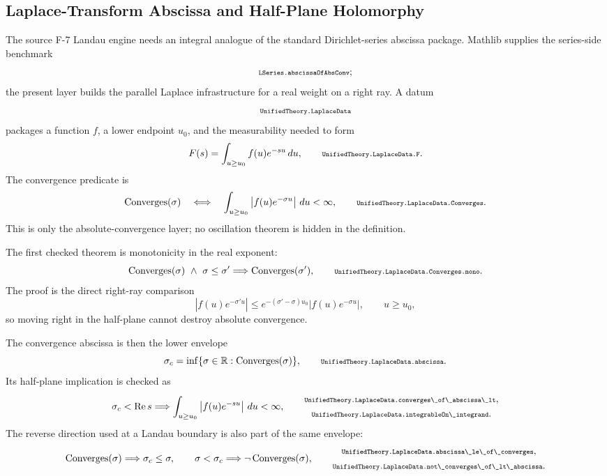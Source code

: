\documentclass[11pt]{article}
\newcommand{\lean}[1]{\relax\ifmmode\hbox{\scriptsize\ttfamily\detokenize{#1}}\else{\small\texttt{\detokenize{#1}}}\fi}
\begin{document}
\subsection{Laplace-Transform Abscissa and Half-Plane Holomorphy}

The source F-7 Landau engine needs an integral analogue of the standard Dirichlet-series abscissa package.  Mathlib supplies the series-side benchmark
$$
  \lean{LSeries.abscissaOfAbsConv};
$$
the present layer builds the parallel Laplace infrastructure for a real weight on a right ray.  A datum
$$
  \lean{UnifiedTheory.LaplaceData}
$$
packages a function $f$, a lower endpoint $u_0$, and the measurability needed to form
$$
  F(s)=\int_{u\ge u_0} f(u)e^{-su}\,du,
  \qquad
  \lean{UnifiedTheory.LaplaceData.F}.
$$
The convergence predicate is
$$
  \operatorname{Converges}(\sigma)
  \quad\Longleftrightarrow\quad
  \int_{u\ge u_0} \left|f(u)e^{-\sigma u}\right|\,du<\infty,
  \qquad
  \lean{UnifiedTheory.LaplaceData.Converges}.
$$
This is only the absolute-convergence layer; no oscillation theorem is hidden in the definition.

The first checked theorem is monotonicity in the real exponent:
$$
  \operatorname{Converges}(\sigma)\ \wedge\ \sigma\le\sigma'
  \Longrightarrow
  \operatorname{Converges}(\sigma'),
  \qquad
  \lean{UnifiedTheory.LaplaceData.Converges.mono}.
$$
The proof is the direct right-ray comparison
$$
  \left|f(u)e^{-\sigma' u}\right|
  \le
  e^{-(\sigma'-\sigma)u_0}\left|f(u)e^{-\sigma u}\right|,
  \qquad u\ge u_0,
$$
so moving right in the half-plane cannot destroy absolute convergence.

The convergence abscissa is then the lower envelope
$$
  \sigma_c
  =
  \inf\{\sigma\in\mathbb R:\operatorname{Converges}(\sigma)\},
  \qquad
  \lean{UnifiedTheory.LaplaceData.abscissa}.
$$
Its half-plane implication is checked as
$$
  \sigma_c<\operatorname{Re}s
  \Longrightarrow
  \int_{u\ge u_0}\left|f(u)e^{-su}\right|\,du<\infty,
  \qquad
  \begin{gathered}
  \lean{UnifiedTheory.LaplaceData.converges\_of\_abscissa\_lt},\\
  \lean{UnifiedTheory.LaplaceData.integrableOn\_integrand}.
  \end{gathered}
$$
The reverse direction used at a Landau boundary is also part of the same envelope:
$$
  \operatorname{Converges}(\sigma)\Longrightarrow\sigma_c\le\sigma,
  \qquad
  \sigma<\sigma_c\Longrightarrow\neg\operatorname{Converges}(\sigma),
  \qquad
  \begin{gathered}
  \lean{UnifiedTheory.LaplaceData.abscissa\_le\_of\_converges},\\
  \lean{UnifiedTheory.LaplaceData.not\_converges\_of\_lt\_abscissa}.
  \end{gathered}
$$
\end{document}
